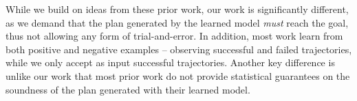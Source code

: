 \documentclass[letterpaper]{article}
\begin{document}

While we build on ideas from these prior work, our work is significantly different, as we demand that  the plan generated by the learned model {\em must} reach the goal, thus not allowing any form of trial-and-error. 
In addition, most work learn from both positive and negative examples -- observing successful and failed trajectories, while we only accept as input successful trajectories. 
Another key difference is unlike our work that most prior work do not provide statistical guarantees on the soundness of the plan generated with their learned model. 


\end{document}
